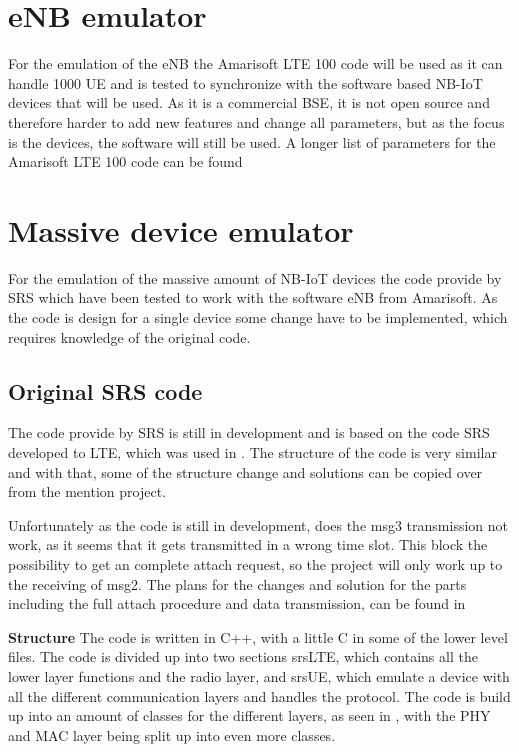 \section{eNB emulator}
For the emulation of the eNB the Amarisoft LTE 100 code will be used as it can handle 1000 \gls{UE}  and is tested to synchronize with the software based NB-IoT devices that will be used. As it is a commercial BSE, it is not open source and therefore harder to add new features and change all parameters, but as the focus is the devices, the software will still be used. A longer list of parameters for the Amarisoft LTE 100 code can be found 

\section{Massive device emulator}
For the emulation of the massive amount of NB-IoT devices the code provide by SRS which have been tested to work with the software eNB from Amarisoft. As the code is design for a single device some change have to be implemented, which requires knowledge of the original code.

\subsection{Original SRS code}
The code provide by SRS is still in development and is based on the code SRS developed to LTE, which was used in . The structure of the code is very similar and with that, some of the structure change and solutions can be copied over from the mention project.

Unfortunately as the code is still in development, does the msg3 transmission not work, as it seems that it gets transmitted in a wrong time slot.  This block the possibility to get an complete attach request, so the project will only work up to the receiving of msg2. The plans for the changes and solution for the parts including the full attach procedure and data transmission, can be found in 

\textbf{Structure}
The code is written in C++, with a little C in some of the lower level files. The code is divided up into two sections srsLTE, which contains all the lower layer functions and the radio layer, and srsUE, which emulate a device with all the different communication layers and handles the protocol. The code is build up into an amount of classes for the different layers, as seen in , with the PHY and MAC layer being split up into even more classes.

